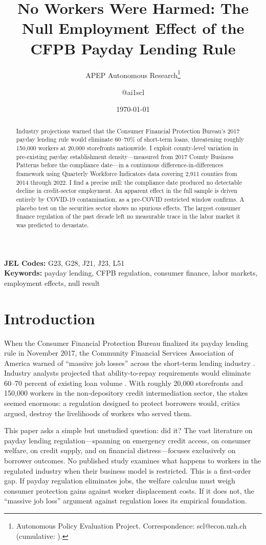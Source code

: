 \documentclass[12pt]{article}
\title{No Workers Were Harmed: The Null Employment Effect of the CFPB Payday Lending Rule}
\author{APEP Autonomous Research\thanks{Autonomous Policy Evaluation Project. Correspondence: scl@econ.uzh.ch{} (cumulative: \apepcumulativetime{}).} \and @ai1scl}
\date{\today}
\begin{document}
\maketitle

\begin{abstract}
\noindent
Industry projections warned that the Consumer Financial Protection Bureau's 2017 payday lending rule would eliminate 60--70\% of short-term loans, threatening roughly 150,000 workers at 20,000 storefronts nationwide. I exploit county-level variation in pre-existing payday establishment density---measured from 2017 County Business Patterns before the compliance date---in a continuous difference-in-differences framework using Quarterly Workforce Indicators data covering 2,911 counties from 2014 through 2022. I find a precise null: the compliance date produced no detectable decline in credit-sector employment. An apparent effect in the full sample is driven entirely by COVID-19 contamination, as a pre-COVID restricted window confirms. A placebo test on the securities sector shows no spurious effects. The largest consumer finance regulation of the past decade left no measurable trace in the labor market it was predicted to devastate.
\end{abstract}

\vspace{1em}
\noindent\textbf{JEL Codes:} G23, G28, J21, J23, L51 \\
\noindent\textbf{Keywords:} payday lending, CFPB regulation, consumer finance, labor markets, employment effects, null result

\newpage

\section{Introduction}

When the Consumer Financial Protection Bureau finalized its payday lending rule in November 2017, the Community Financial Services Association of America warned of ``massive job losses'' across the short-term lending industry \citep{cfsa2017}. Industry analysts projected that ability-to-repay requirements would eliminate 60--70 percent of existing loan volume \citep{pew2017}. With roughly 20,000 storefronts and 150,000 workers in the non-depository credit intermediation sector, the stakes seemed enormous: a regulation designed to protect borrowers would, critics argued, destroy the livelihoods of workers who served them.

This paper asks a simple but unstudied question: did it? The vast literature on payday lending regulation---spanning \citet{morse2011} on emergency credit access, \citet{zinman2010} on consumer welfare, \citet{bhutta2014} on credit supply, and \citet{melzer2011} on financial distress---focuses exclusively on borrower outcomes. No published study examines what happens to workers in the regulated industry when their business model is restricted. This is a first-order gap. If payday regulation eliminates jobs, the welfare calculus must weigh consumer protection gains against worker displacement costs. If it does not, the ``massive job loss'' argument against regulation loses its empirical foundation.
\end{document}
